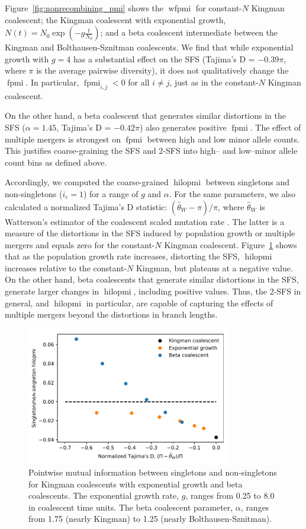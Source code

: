 \documentclass[11pt, letterpaper]{article}   	%
\newcommand{\Fig}[1]{Figure~\ref{#1}}
\DeclareMathOperator{\fpmi}{fpmi}
\DeclareMathOperator{\wfpmi}{wfpmi}
\DeclareMathOperator{\hilopmi}{hilopmi}
\begin{document}
\Fig{fig:nonrecombining_pmi} shows the $\wfpmi$ for constant-$N$ Kingman coalescent; the Kingman coalescent with exponential growth, $N(t)=N_0 \exp(-g \frac{t}{N_0})$; and a beta coalescent intermediate between the Kingman and Bolthausen-Sznitman coalescents.
We find that while exponential growth with $g=4$ has a substantial effect on the SFS (Tajima's D = $-0.39 \pi$, where $\pi$ is the average pairwise diversity), it does not qualitatively change the $\fpmi$.
In particular, $\fpmi_{i,j} < 0$ for all $i \neq j$, just as in the constant-$N$ Kingman coalescent.

On the other hand, a beta coalescent that generates similar distortions in the SFS ($\alpha=1.45$, Tajima's D = $-0.42 \pi$) also generates positive $\fpmi$.
The effect of multiple mergers is strongest on $\fpmi$ between high and low minor allele counts.
This justifies coarse-graining the SFS and 2-SFS into high-- and low--minor allele count bins as defined above.

Accordingly, we computed the coarse-grained $\hilopmi$ between singletons and non-singletons ($i_c = 1$) for a range of $g$ and $\alpha$.
For the same parameters, we also calculated a normalized Tajima's D statistic:
$(\hat{\theta}_W - \pi) / \pi$, where $\hat{\theta}_W$ is Watterson's estimator of the coalescent scaled mutation rate \autocite{Watterson19??}.
The latter is a measure of the distortions in the SFS induced by population growth or multiple mergers and equals zero for the constant-$N$ Kingman coalescent.
\Fig{fig:fpmi_vs_tajimasd} shows that as the population growth rate increases, distorting the SFS, $\hilopmi$ increases relative to the constant-$N$ Kingman, but plateaus at a negative value.
On the other hand, beta coalescents that generate similar distortions in the SFS, generate larger changes in $\hilopmi$, including positive values.
Thus, the 2-SFS in general, and $\hilopmi$ in particular, are capable of capturing the effects of multiple mergers beyond the distortions in branch lengths.

\begin{figure}
\centering
\includegraphics[width=0.8\textwidth]{figures/figure2.pdf}
\caption{Pointwise mutual information between singletons and non-singletons for Kingman coalescents with exponential growth and beta coalescents. The exponential growth rate, $g$, ranges from 0.25 to 8.0 in coalescent time units. The beta coalescent parameter, $\alpha$, ranges from 1.75 (nearly Kingman) to 1.25 (nearly Bolthausen-Sznitman). \label{fig:fpmi_vs_tajimasd}}
\end{figure}
\end{document}
